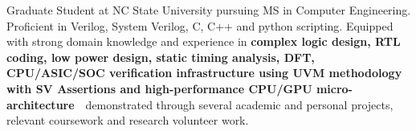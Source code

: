 

\begin{cvparagraph}

Graduate Student at NC State University pursuing MS in Computer Engineering. Proficient in Verilog, System Verilog, C, C++ and python scripting. Equipped with strong domain knowledge and experience in \textbf{complex logic design, RTL coding, low power design, static timing analysis, DFT, CPU/ASIC/SOC verification infrastructure using UVM methodology with SV Assertions and high-performance CPU/GPU micro-architecture}\ \ demonstrated through several academic and personal projects, relevant coursework and research volunteer work.

\end{cvparagraph}
